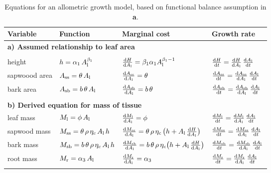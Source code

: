 \documentclass[12pt, a4paper]{article}
\begin{document}
\begin{table}[ht]
\caption{Equations for an allometric growth model, based on functional balance assumption in {\textbf a}. }
\centering

{\footnotesize  %
 \begin{doublespace}
  \begin{tabular}{p{2.5cm}p{3.5cm}p{5cm}p{4cm} }\\ \hline
  Variable & Function & Marginal cost & Growth rate\\ \hline
  \multicolumn{4}{l}{\textbf{a) Assumed relationship to leaf area}} \\ \\
  height &
    $h = \alpha_1 \, A_{\rm l}^{\beta_1}$ &
    $\frac{{\rm d}H}{{\rm d}A_{\rm l}} =  \beta_1 \alpha_1 A_{\rm l}^{\beta_1-1}$ &
    $\frac{{\rm d}H}{{\rm d}t}  = \frac{{\rm d}H}{{\rm d}A_{\rm l}} \, \frac{{\rm d}A_{\rm l}}{{\rm d}t}$ \\
  sapwoood area &
    $A_\textrm{ss} = \theta \, A_{\rm l}$ &
    $\frac{{\rm d}A_\textrm{ss}}{{\rm d} A_{\rm l}} = \theta$ &
    $\frac{{\rm d}A_\textrm{ss}}{{\rm d}t}  =\frac{{\rm d}A_\textrm{ss}}{{\rm d} A_{\rm l}} \, \frac{{\rm d}A_{\rm l}}{{\rm d}t}$ \\
  bark area &
    $A_{\rm sb} = b \, \theta \, A_{\rm l}$ &
    $\frac{{\rm d}A_{\rm sb}}{{\rm d} A_{\rm l}} = b \, \theta$ &
    $\frac{{\rm d}A_{\rm sb}}{{\rm d}t} = \frac{{\rm d}A_{\rm sb}}{{\rm d} A_{\rm l}} \, \frac{{\rm d}A_{\rm l}}{{\rm d}t}$ \\  \\
  \multicolumn{4}{l}{\textbf{b) Derived equation for mass of tissue }} \\
  leaf mass &
    $M_{\rm l} = \phi \, A_{\rm l} $ &
    $\frac{{\rm d}M_{\rm l}}{{\rm d}A_{\rm l}} = \phi$ &
    $\frac{{\rm d}M_{\rm l}}{{\rm d}t}  = \frac{{\rm d}M_{\rm l}}{{\rm d}A_{\rm l}}  \, \frac{{\rm d}A_{\rm l}}{{\rm d}t}$ \\
  sapwood mass &
    $M_\textrm{ss} = \theta \, \rho \, \eta_c \, A_{\rm l} \, h $ &
    $\frac{{\rm d}M_\textrm{ss}}{{\rm d}A_{\rm l}} = \theta\, \rho\, \eta_c\, \big( h + A_{\rm l}\, \frac{{\rm d}H}{{\rm d}A_{\rm l}} \big)$ &
    $\frac{{\rm d}M_\textrm{ss}}{{\rm d}t}  = \frac{{\rm d}M_\textrm{ss}}{{\rm d}A_{\rm l}} \, \frac{{\rm d}A_{\rm l}}{{\rm d}t}$ \\
  bark mass &
    $M_{\rm sb} = b\, \theta \, \rho \, \eta_c \, A_{\rm l} \, h $ &
    $\frac{{\rm d}M_{\rm sb}}{{\rm d}A_{\rm l}} = b \, \theta \, \rho \, \eta_c\big( h + A_{\rm l} \, \frac{{\rm d}H}{{\rm d}A_{\rm l}} \big)$ &
    $\frac{{\rm d}M_{\rm sb}}{{\rm d}t}  = \frac{{\rm d}M_{\rm sb}}{{\rm d}A_{\rm l}} \, \frac{{\rm d}A_{\rm l}}{{\rm d}t}$ \\
  root mass &
    $M_{\rm r} = \alpha_3 \, A_{\rm l}$ &
    $\frac{{\rm d}M_{\rm r}}{{\rm d}A_{\rm l}} = \alpha_3$  &
    $\frac{{\rm d}M_{\rm r}}{{\rm d}t}  = \frac{{\rm d}M_{\rm r}}{{\rm d}A_{\rm l}}  \, \frac{{\rm d}A_{\rm l}}{{\rm d}t}$ \\ \\


\end{tabular}
\end{doublespace}}
\end{table}
\end{document}
